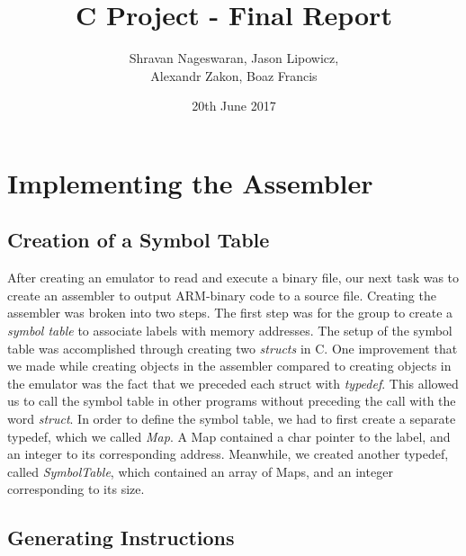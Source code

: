 \documentclass[11pt]{article}
\begin{document}
\title{\textbf{C Project - Final Report}}
\author{Shravan Nageswaran, Jason Lipowicz,\\ Alexandr Zakon, Boaz Francis}
\date{20th June 2017}

\maketitle

\vspace{0.2in}

\section{Implementing the Assembler}

\subsection{Creation of a Symbol Table}

After creating an emulator to read and execute a binary file, our next task was to create an assembler to output ARM-binary code to a source file. Creating the assembler was broken into two steps. The first step was for the group to create a \emph{symbol table} to associate labels with memory addresses. The setup of the symbol table was accomplished through creating two \emph{structs} in C. One improvement that we made while creating objects in the assembler compared to creating objects in the emulator was the fact that we preceded each struct with \emph{typedef}. This allowed us to call the symbol table in other programs without preceding the call with the word \emph{struct}. In order to define the symbol table, we had to first create a separate typedef, which we called \emph{Map}. A Map contained a char pointer to the label, and an integer to its corresponding address. Meanwhile, we created another typedef, called \emph{SymbolTable}, which contained an array of Maps, and an integer corresponding to its size.

\subsection{Generating Instructions}
\end{document}
